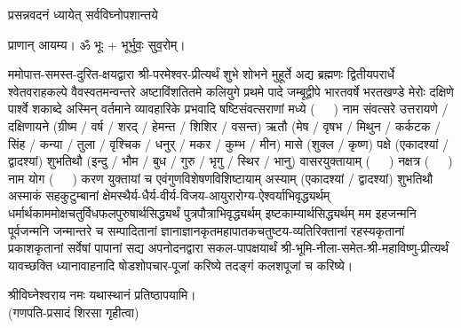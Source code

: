 
\setlength{\parindent}{0pt}




{प्रसन्नवदनं ध्यायेत् सर्वविघ्नोपशान्तये}

प्राणान्  आयम्य।  ॐ भूः + भूर्भुवः॒ सुव॒रोम्।


ममोपात्त-समस्त-दुरित-क्षयद्वारा श्री-परमेश्वर-प्रीत्यर्थं शुभे शोभने मुहूर्ते अद्य ब्रह्मणः
द्वितीयपरार्धे श्वेतवराहकल्पे वैवस्वतमन्वन्तरे अष्टाविंशतितमे कलियुगे प्रथमे पादे
जम्बूद्वीपे भारतवर्षे भरतखण्डे मेरोः दक्षिणे पार्श्वे शकाब्दे अस्मिन् वर्तमाने व्यावहारिके
प्रभवादि षष्टिसंवत्सराणां मध्ये \mbox{(~~~)} नाम संवत्सरे उत्तरायणे / दक्षिणायने
(ग्रीष्म / वर्ष / शरद् / हेमन्त / शिशिर / वसन्त) ऋतौ  (मेष / वृषभ / मिथुन / कर्कटक / सिंह / कन्या / तुला /
वृश्चिक / धनुर् / मकर / कुम्भ / मीन) मासे (शुक्ल / कृष्ण) पक्षे (एकादश्यां / द्वादश्यां) शुभतिथौ
(इन्दु / भौम / बुध / गुरु / भृगु / स्थिर / भानु) वासरयुक्तायाम्
\mbox{(~~~)} नक्षत्र \mbox{(~~~)} नाम  योग  \mbox{(~~~)} करण युक्तायां च एवं\-गुण\-विशेषण\-विशिष्टायाम्
अस्याम् (एकादश्यां / द्वादश्यां) शुभतिथौ
अस्माकं सहकुटुम्बानां क्षेमस्थैर्य-धैर्य-वीर्य-विजय-आयुरारोग्य-ऐश्वर्याभिवृद्ध्यर्थम्
धर्मार्थकाममोक्ष\-चतुर्विधफलपुरुषार्थसिद्ध्यर्थं पुत्रपौत्राभि\-वृद्ध्यर्थम् इष्टकाम्यार्थसिद्ध्यर्थम्
मम इहजन्मनि पूर्वजन्मनि जन्मान्तरे च सम्पादितानां ज्ञानाज्ञानकृतमहा\-पातकचतुष्टय-व्यतिरिक्तानां रहस्यकृतानां प्रकाशकृतानां सर्वेषां पापानां सद्य अपनोदनद्वारा सकल-पापक्षयार्थं श्री-भूमि-नीला-समेत-श्री-महाविष्णु-प्रीत्यर्थं यावच्छक्ति ध्यानावाहनादि
षोडशोपचार-पूजां करिष्ये तदङ्गं कलशपूजां च करिष्ये।


श्रीविघ्नेश्वराय नमः यथास्थानं प्रतिष्ठापयामि।\\
(गणपति-प्रसादं शिरसा गृहीत्वा)

\renewcommand{\devaName}{विष्णु}












